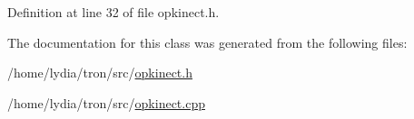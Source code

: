 Definition at line 32 of file opkinect.\+h.



The documentation for this class was generated from the following files\+:\begin{DoxyCompactItemize}
\item 
/home/lydia/tron/src/\hyperlink{opkinect_8h}{opkinect.\+h}\item 
/home/lydia/tron/src/\hyperlink{opkinect_8cpp}{opkinect.\+cpp}\end{DoxyCompactItemize}
